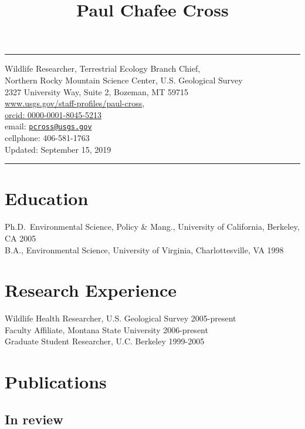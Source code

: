 \documentclass[12pt,]{article}
\title{Paul Chafee Cross}
\author{}
\date{}
\begin{document}
\maketitle

\hrule
\centering

Wildlife Researcher, Terrestrial Ecology Branch Chief,\\
Northern Rocky Mountain Science Center, U.S. Geological Survey\\
2327 University Way, Suite 2, Bozeman, MT 59715\\
\href{http://www.usgs.gov/staff-profiles/paul-cross}{www.usgs.gov/staff-profiles/paul-cross},\\
\href{http://orcid.org/0000-0001-8045-5213}{orcid:
0000-0001-8045-5213}\\
email: \href{mailto:pcross@usgs.gov}{\nolinkurl{pcross@usgs.gov}}\\
cellphone: 406-581-1763\\
Updated: September 15, 2019

\hrule

\raggedright

\hypertarget{education}{%
\section{Education}\label{education}}

Ph.D.~Environmental Science, Policy \& Mang., University of California,
Berkeley, CA \hfill 2005\\
B.A., Environmental Science, University of Virginia, Charlottesville, VA
\hfill 1998

\hypertarget{research-experience}{%
\section{Research Experience}\label{research-experience}}

Wildlife Health Researcher, U.S. Geological Survey \hfill 2005-present\\
Faculty Affiliate, Montana State University \hfill 2006-present\\
Graduate Student Researcher, U.C. Berkeley \hfill 1999-2005

\hypertarget{publications}{%
\section{Publications}\label{publications}}

\hypertarget{in-review}{%
\subsection{In review}\label{in-review}}
\end{document}
